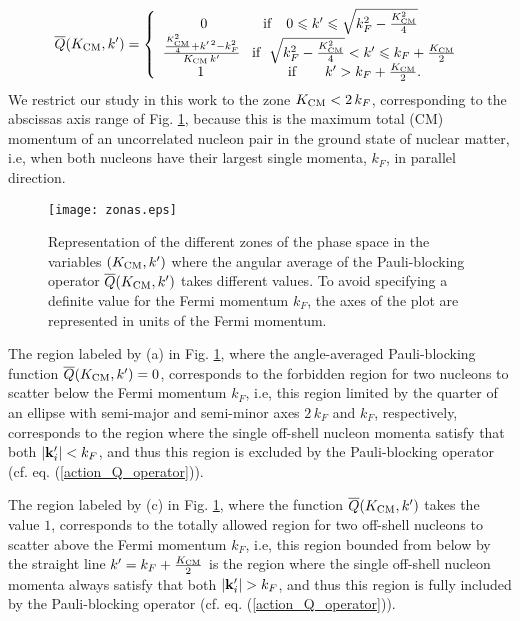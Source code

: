 \documentclass[aps,twocolumn,showpacs,preprintnumbers,amsmath,amssymb,nofootinbib,superscriptaddress,showkeys,noeprint]{revtex4-1}
\newcommand{\nk}{{\bf k}}
\begin{document}
\begin{equation}\label{Qbar_function}
\overline{Q}(K_{\rm CM},k^\prime)=
\left\{
\begin{array}{c}
0 \qquad \quad \quad {\rm if} \quad 0 \leqslant k^\prime \leqslant 
\sqrt{k^2_F - \frac{K^2_{\rm CM}}{4}} \\
\frac{\frac{K^2_{\rm CM}}{4}+k^{\prime\,2}-k^2_F}{K_{\rm CM}\, k^\prime}
\;\;\; {\rm if} \;\; \sqrt{k^2_F - \frac{K^2_{\rm CM}}{4}}
< k^\prime \leqslant k_F+\frac{K_{\rm CM}}{2}  \\
1 \qquad \qquad \qquad {\rm if} \qquad k^\prime > 
k_F+\frac{K_{\rm CM}}{2}.
\end{array}
\right.
\end{equation}
We restrict our study in this work to the zone $K_{\rm CM}<2\, k_F$,
corresponding to the abscissas axis range of Fig. \ref{Fig:zones},
because this is the maximum total (CM) momentum of an uncorrelated
nucleon pair in the ground state of nuclear matter, i.e, when both
nucleons have their largest single momenta, $k_F$, in parallel
direction.

\begin{figure}[ht]
\texttt{[image: zonas.eps]}
\caption{Representation of the different zones of the phase space in
  the variables $(K_{\rm CM},k^\prime)$ where the angular average of
  the Pauli-blocking operator $\overline{Q}(K_{\rm CM},k^\prime)$
  takes different values. To avoid specifying a definite value for the
  Fermi momentum $k_F$, the axes of the plot are represented in units
  of the Fermi momentum.}
\label{Fig:zones}
\end{figure}

The region labeled by (a) in Fig. \ref{Fig:zones}, where the
angle-averaged Pauli-blocking function $\overline{Q}(K_{\rm
  CM},k^\prime)=0$, corresponds to the forbidden region for two
nucleons to scatter below the Fermi momentum $k_F$, i.e, this region
limited by the quarter of an ellipse with semi-major and semi-minor
axes $2\,k_F$ and $k_F$, respectively, corresponds to the region where
the single off-shell nucleon momenta satisfy that both
$\left|\nk^\prime_i\right|<k_F$, and thus this region is excluded by
the Pauli-blocking operator (cf. eq. (\ref{action_Q_operator})).

The region labeled by (c) in Fig. \ref{Fig:zones}, where the function
$\overline{Q}(K_{\rm CM},k^\prime)$ takes the value $1$, corresponds
to the totally allowed region for two off-shell nucleons to scatter
above the Fermi momentum $k_F$, i.e, this region bounded from below by
the straight line $k^\prime=k_F+\frac{K_{\rm CM}}{2}$ is the region
where the single off-shell nucleon momenta always satisfy that both
$\left|\nk^\prime_i\right|>k_F$, and thus this region is fully
included by the Pauli-blocking operator
(cf. eq. (\ref{action_Q_operator})).
\end{document}
